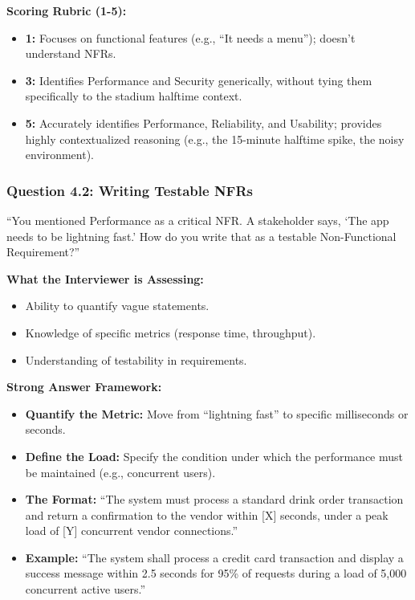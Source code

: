 \textbf{Scoring Rubric (1-5):}

\begin{itemize}
\tightlist
\item
  \textbf{1:} Focuses on functional features (e.g., ``It needs a
  menu''); doesn't understand NFRs.
\item
  \textbf{3:} Identifies Performance and Security generically, without
  tying them specifically to the stadium halftime context.
\item
  \textbf{5:} Accurately identifies Performance, Reliability, and
  Usability; provides highly contextualized reasoning (e.g., the
  15-minute halftime spike, the noisy environment).
\end{itemize}

\subsubsection{Question 4.2: Writing Testable
NFRs}\label{question-4.2-writing-testable-nfrs}

``You mentioned Performance as a critical NFR. A stakeholder says, `The
app needs to be lightning fast.' How do you write that as a testable
Non-Functional Requirement?''

\textbf{What the Interviewer is Assessing:}

\begin{itemize}
\tightlist
\item
  Ability to quantify vague statements.
\item
  Knowledge of specific metrics (response time, throughput).
\item
  Understanding of testability in requirements.
\end{itemize}

\textbf{Strong Answer Framework:}

\begin{itemize}
\tightlist
\item
  \textbf{Quantify the Metric:} Move from ``lightning fast'' to specific
  milliseconds or seconds.
\item
  \textbf{Define the Load:} Specify the condition under which the
  performance must be maintained (e.g., concurrent users).
\item
  \textbf{The Format:} ``The system must process a standard drink order
  transaction and return a confirmation to the vendor within {[}X{]}
  seconds, under a peak load of {[}Y{]} concurrent vendor connections.''
\item
  \textbf{Example:} ``The system shall process a credit card transaction
  and display a success message within 2.5 seconds for 95\% of requests
  during a load of 5,000 concurrent active users.''
\end{itemize}

